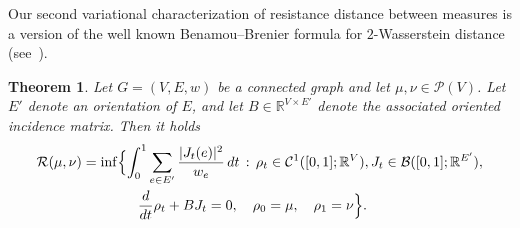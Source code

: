 \documentclass[11pt,a4paper]{article}
\newcommand{\Resis}{\mathcal{R}}
\newcommand{\Prob}{\mathscr{P}}
\newtheorem{theorem}{Theorem}[section]
\begin{document}
Our second variational characterization of resistance distance between measures is a version of the well known Benamou--Brenier formula for $2$-Wasserstein distance (see~\cite{benamou2000computational}). 

\begin{theorem}\label{thm:benamou-brenier-graphs}
    Let $G=(V,E,w)$ be a connected graph and let $\mu,\nu\in\Prob(V)$. Let $E'$ denote an orientation of $E$, and let $B\in\mathbb{R}^{V\times E'}$ denote the associated oriented incidence matrix. Then it holds
        \begin{align}\label{eq:benamou-brenier-graph}
            \Resis (\mu,\nu) &= \inf \Bigl\{\int_0^1 \sum_{e\in E'} \frac{|J_t(e)|^2}{w_e} \, dt \,:\, \rho_t\in \mathcal{C}^1([0,1]; \mathbb{R}^{V}), J_t\in \mathcal{B}([0,1]; \mathbb{R}^{E'}),\\
            &\qquad\qquad \frac{d}{dt} \rho_t + B J_t = 0,\quad \rho_0 = \mu,\quad \rho_1 = \nu\Bigr\}.
        \end{align}
\end{theorem}
\end{document}
